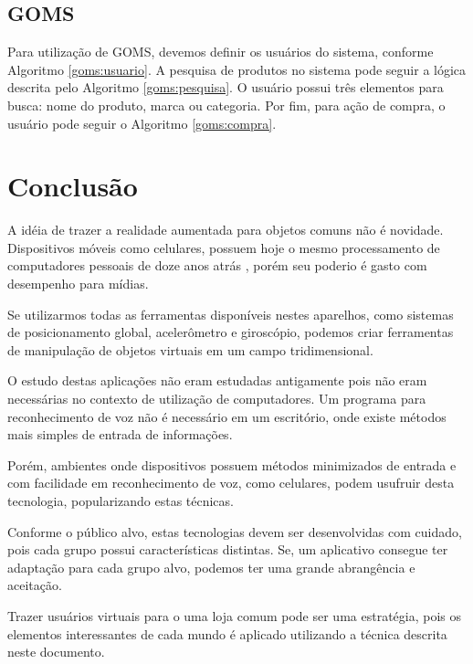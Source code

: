 \documentclass{article}
\begin{document}
\subsection{GOMS}

Para utilização de GOMS, devemos definir os usuários do sistema, conforme
Algoritmo \ref{goms:usuario}. A pesquisa de produtos no sistema pode seguir a
lógica descrita pelo Algoritmo \ref{goms:pesquisa}. O usuário possui três
elementos para busca: nome do produto, marca ou categoria. Por fim, para ação de
compra, o usuário pode seguir o Algoritmo \ref{goms:compra}.

\begin{footnotesize}
    
\end{footnotesize}

\begin{footnotesize}
    
\end{footnotesize}

\begin{footnotesize}
    
\end{footnotesize}

\section{Conclusão}
\label{sec:conclusao}

A idéia de trazer a realidade aumentada para objetos comuns não é novidade.
Dispositivos móveis como celulares, possuem hoje o mesmo processamento de
computadores pessoais de doze anos atrás \cite{canny2006}, porém seu poderio é
gasto com desempenho para mídias.

Se utilizarmos todas as ferramentas disponíveis nestes aparelhos, como sistemas
de posicionamento global, acelerômetro e giroscópio, podemos criar ferramentas
de manipulação de objetos virtuais em um campo tridimensional.

O estudo destas aplicações não eram estudadas antigamente pois não eram
necessárias no contexto de utilização de computadores. Um programa para
reconhecimento de voz não é necessário em um escritório, onde existe métodos
mais simples de entrada de informações.

Porém, ambientes onde dispositivos possuem métodos minimizados de entrada e com
facilidade em reconhecimento de voz, como celulares, podem usufruir desta
tecnologia, popularizando estas técnicas.

Conforme o público alvo, estas tecnologias devem ser desenvolvidas com cuidado,
pois cada grupo possui características distintas. Se, um aplicativo consegue ter
adaptação para cada grupo alvo, podemos ter uma grande abrangência e aceitação.

Trazer usuários virtuais para o uma loja comum pode ser uma estratégia, pois os
elementos interessantes de cada mundo é aplicado utilizando a técnica descrita
neste documento.



\end{document}
